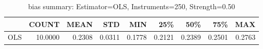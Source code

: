 \begin{table}[ht]
\centering
\caption{bias summary: Estimator=OLS, Instruments=250, Strength=0.50}
\begin{tabular}{lrrrrrrrr}
\toprule
 & COUNT & MEAN & STD & MIN & 25\% & 50\% & 75\% & MAX \\
\midrule
OLS & 10.0000 & 0.2308 & 0.0311 & 0.1778 & 0.2121 & 0.2389 & 0.2501 & 0.2763 \\
\bottomrule
\end{tabular}
\end{table}
